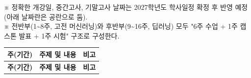 \documentclass[11pt,a4paper]{article}
\begin{document}
\vspace{3mm}


\vspace{2mm}

{\small ※ 정확한 개강일, 중간고사, 기말고사 날짜는 2027학년도 학사일정 확정 후 반영 예정 (아래 날짜란은 공란으로 둠). \\※ 전반부(1\textasciitilde{}8주, 고전 머신러닝)와 후반부(9\textasciitilde{}16주, 딥러닝) 모두 "6주 수업 + 1주 캡스톤 발표 + 1주 시험" 구조로 구성한다.}

\vspace{3mm}


\noindent
\begin{longtable}{|C{2.0cm}|L{11.3cm}|C{2.3cm}|}
\hline
\bf 주(기간) & \bf\centering 주제 및 내용 & \bf 비고 \\
\hline
\endfirsthead
\hline
\bf 주(기간) & \bf\centering 주제 및 내용 & \bf 비고 \\
\hline
\endhead



\end{longtable}
\end{document}
